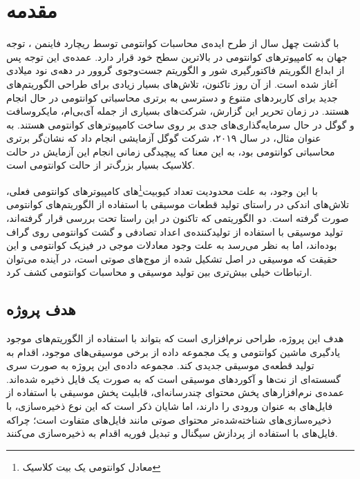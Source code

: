\chapter{مقدمه}


با گذشت چهل سال از طرح ایده‌ی محاسبات کوانتومی توسط ریچارد فاینمن
\cite{feynman}،
توجه جهان به کامپیوترهای کوانتومی در بالاترین سطح خود قرار دارد.
عمده‌ی این توجه پس از ابداع الگوریتم فاکتورگیری شور
و الگوریتم جست‌وجوی گروور
در دهه‌ی نود میلادی آغاز شده است. از آن روز تاکنون، تلاش‌های بسیار زیادی برای طراحی الگوریتم‌های جدید برای کاربردهای متنوع و دسترسی به برتری محاسباتی کوانتومی در حال انجام هستند. در زمان تحریر این گزارش، شرکت‌های بسیاری از جمله آی‌بی‌ام، مایکروسافت و گوگل در حال سرمایه‌گذاری‌های جدی بر روی ساخت کامپیوترهای کوانتومی هستند. به عنوان مثال، در سال ۲۰۱۹،
شرکت گوگل آزمایشی 
\cite{google_supremacy}
انجام داد که نشان‌گر برتری محاسباتی کوانتومی بود، به این معنا که پیچیدگی زمانی انجام این آزمایش در حالت کلاسیک بسیار بزرگ‌تر از حالت کوانتومی است.

با این وجود، به علت محدودیت تعداد کیوبیت\footnote{معادل کوانتومی یک بیت کلاسیک}های کامپیوترهای کوانتومی فعلی، تلاش‌های اندکی در راستای تولید قطعات موسیقی با استفاده از الگوریتم‌های کوانتومی صورت گرفته است. دو الگوریتمی که تاکنون در این راستا تحت بررسی قرار گرفته‌اند، تولید موسیقی با استفاده از تولیدکننده‌ی اعداد تصادفی
و گشت کوانتومی روی گراف \cite{miranda}
بوده‌اند، اما به نظر می‌رسد به علت وجود معادلات موجی در فیزیک کوانتومی و این حقیقت که موسیقی در اصل تشکیل شده از موج‌های صوتی است، در آینده می‌توان ارتباطات خیلی بیش‌تری بین تولید موسیقی و محاسبات کوانتومی کشف کرد.

\section{هدف پروژه}
هدف این پروژه، طراحی نرم‌افزاری است که بتواند با استفاده از الگوریتم‌های موجود یادگیری ماشین کوانتومی و یک  مجموعه داده از برخی موسیقی‌های موجود، اقدام به تولید قطعه‌ی موسیقی
جدیدی کند.
مجموعه داده‌ی این پروژه به صورت سری گسسته‌ای از نت‌ها و آکوردهای موسیقی است که به صورت یک فایل 
ذخیره شده‌اند.
عمده‌ی نرم‌افزارهای پخش محتوای چندرسانه‌ای، قابلیت پخش موسیقی با استفاده از فایل‌های 
به عنوان ورودی را دارند، اما
 شایان ذکر است که این نوع ذخیره‌سازی، با ذخیره‌سازی‌های شناخته‌شده‌تر محتوای صوتی مانند فایل‌های 
 متفاوت است؛ چراکه فایل‌های
 با استفاده از پردازش سیگنال و تبدیل فوریه اقدام به ذخیره‌سازی می‌کنند.
 
